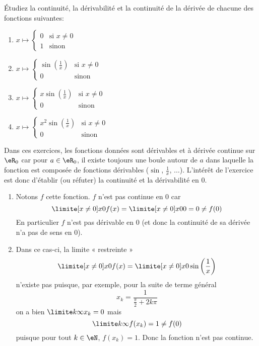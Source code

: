 \begin{example}\label{EXOooMWGTooLZpgxM}\label{exo0035}

Étudiez la continuité, la dérivabilité et la continuité de la dérivée de chacune des fonctions suivantes:
\begin{enumerate}
	\item $x \mapsto \left\{ \begin{array}{ll} 0 & \mbox{si } x \not= 0 \\ 1 & \mbox{sinon} \end{array} \right.  $
	\item $x \mapsto \left\{ \begin{array}{ll} \sin(\frac{1}{x}) & \mbox{si } x \not= 0 \\ 0 & \mbox{sinon} \end{array} \right.  $
	\item $x \mapsto \left\{ \begin{array}{ll} x \sin(\frac{1}{x}) & \mbox{si } x \not= 0 \\ 0 & \mbox{sinon} \end{array} \right. $
	\item\label{Item0035d} $x \mapsto \left\{ \begin{array}{ll} x^2 \sin(\frac{1}{x}) & \mbox{si } x \not= 0 \\ 0 & \mbox{sinon} \end{array} \right.  $
\end{enumerate}

Dans ces exercices, les fonctions données sont dérivables et à dérivée
continue sur $\eR_0$ car pour $a \in \eR_0$, il existe toujours une
boule autour de $a$ dans laquelle la fonction est composée de
fonctions dérivables ($\sin$, $\frac 1x$, $\ldots$). L'intérêt de
l'exercice est donc d'établir (ou réfuter) la continuité et la
dérivabilité en $0$.

\begin{enumerate}

\item 
 Notons $f$ cette fonction. $f$ n'est pas continue en $0$ car
\begin{equation*}
  \limite[x \neq 0] x 0 f(x) = \limite[x \neq 0] x 0 0 = 0 \neq f(0)
\end{equation*}
En particulier $f$ n'est pas dérivable en $0$ (et donc la continuité
de sa dérivée n'a pas de sens en $0$).

\item
Dans ce cas-ci, la limite « restreinte »
\begin{equation*}
  \limite[x \neq 0] x 0 f(x) = \limite[x \neq 0] x 0 \sin\left(\frac 1 x\right)
\end{equation*}
n'existe pas puisque, par exemple, pour la suite de terme général
\begin{equation*}
  x_k = \frac 1 {\frac \pi 2 + 2k \pi}
\end{equation*}
on a bien $\limite k \infty x_k = 0$ mais
\begin{equation*}
  \limite k \infty f(x_k) = 1 \neq f(0)
\end{equation*}
puisque pour tout $k \in \eN$, $f(x_k) = 1$. Donc la fonction n'est pas continue.


\end{enumerate}
\end{example}
